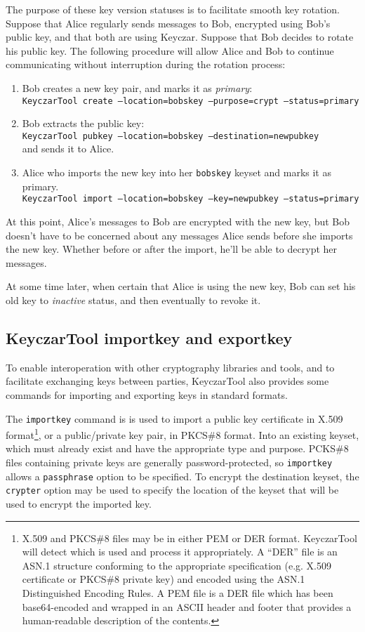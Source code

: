 \documentclass{llncs}
\begin{document}
The purpose of these key version statuses is to facilitate smooth key
rotation.  Suppose that Alice regularly sends messages to Bob,
encrypted using Bob's public key, and that both are using Keyczar.
Suppose that Bob decides to rotate his public key.  The following
procedure will allow Alice and Bob to continue communicating without
interruption during the rotation process:

\begin{enumerate}
\item Bob creates a new key pair, and marks it as {\it primary}: \\
{\tt KeyczarTool create --location=bobskey --purpose=crypt --status=primary}
\item Bob extracts the public key: \\
  {\tt KeyczarTool pubkey --location=bobskey --destination=newpubkey} \\
  and sends it to Alice.
\item Alice who imports the new key into her {\tt bobskey} keyset
  and marks it as primary.\\
{\tt KeyczarTool import --location=bobskey --key=newpubkey --status=primary}
\end{enumerate}

At this point, Alice's messages to Bob are encrypted with the new key,
but Bob doesn't have to be concerned about any messages Alice sends
before she imports the new key.  Whether before or after the import,
he'll be able to decrypt her messages.

At some time later, when certain that Alice is using the new key, Bob
can set his old key to {\it inactive} status, and then eventually to
revoke it.

\subsection{KeyczarTool importkey and exportkey}

To enable interoperation with other cryptography libraries and tools,
and to facilitate exchanging keys between parties, KeyczarTool also
provides some commands for importing and exporting keys in
standard formats.

The {\tt importkey} command is is used to import a public key
certificate in X.509 format\footnote{X.509 and PKCS\#8 files may be in
  either PEM or DER format.  KeyczarTool will detect which is used and
  process it appropriately.  A ``DER'' file is an ASN.1 structure
  conforming to the appropriate specification (e.g. X.509 certificate
  or PKCS\#8 private key) and encoded using the ASN.1 Distinguished
  Encoding Rules.  A PEM file is a DER file which has been
  base64-encoded and wrapped in an ASCII header and footer that
  provides a human-readable description of the contents.}, or a
public/private key pair, in PKCS\#8 format. Into an existing keyset,
which must already exist and have the appropriate type and purpose.
PCKS\#8 files containing private keys are generally
password-protected, so {\tt importkey} allows a {\tt passphrase}
option to be specified.  To encrypt the destination keyset, the {\tt
  crypter} option may be used to specify the location of the keyset
that will be used to encrypt the imported key.
\end{document}
